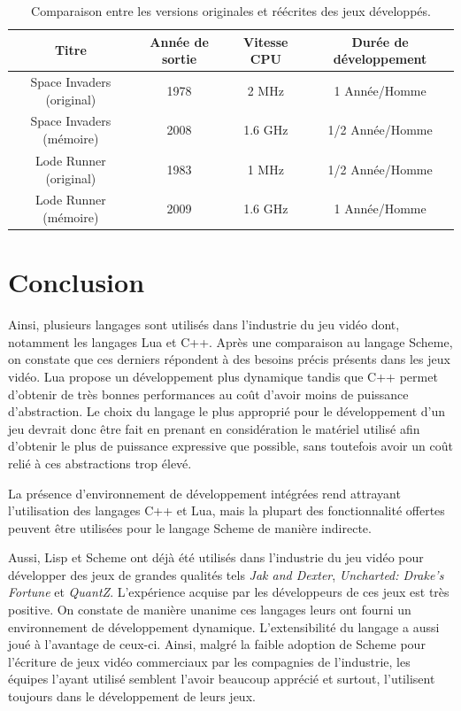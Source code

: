 \documentclass[12pt,twoside,letterpaper,francais]{book}
\newcommand{\customizedTableName}{\textsc{Tableau}}
\begin{document}
\renewcommand{\tablename}{\customizedTableName}
\begin{table}[htb!]
  \begin{tabular}{cccc}
    Titre & Année de sortie & Vitesse CPU & Durée de développement\\
    \hline \hline 
    Space Invaders (original) & 1978 & 2 MHz & 1 Année/Homme\\
    Space Invaders (mémoire) & 2008 & 1.6 GHz & 1/2 Année/Homme\\
    \hline
    Lode Runner (original) & 1983 & 1 MHz & 1/2 Année/Homme\\
    Lode Runner (mémoire) & 2009 & 1.6 GHz & 1 Année/Homme\\
    \hline
  \end{tabular}
  \caption{Comparaison entre les versions originales et réécrites des
    jeux développés.}
  \label{Rev:comp}
\end{table}

\FloatBarrier
\section{Conclusion}
Ainsi, plusieurs langages sont utilisés dans l'industrie du jeu vidéo
dont, notamment les langages Lua et C++. Après une comparaison au
langage Scheme, on constate que ces derniers répondent à des besoins
précis présents dans les jeux vidéo. Lua propose un dévelop\-pement
plus dynamique tandis que C++ permet d'obtenir de très bonnes
performances au coût d'avoir moins de puissance d'abstraction. Le
choix du langage le plus approprié pour le dévelop\-pement d'un jeu
devrait donc être fait en prenant en considération le matériel utilisé
afin d'obtenir le plus de puissance expressive que possible, sans
toutefois avoir un coût relié à ces abstractions trop élevé.

La présence d'environnement de développement intégrées rend attrayant
l'utilisation des langages C++ et Lua, mais la plupart des
fonctionnalité offertes peuvent être utilisées pour le langage Scheme
de manière indirecte.

Aussi, Lisp et Scheme ont déjà été utilisés dans l'industrie du jeu
vidéo pour développer des jeux de grandes qualités tels \textit{Jak
  and Dexter}, \textit{Uncharted: Drake's Fortune} et
\textit{QuantZ}. L'expérience acquise par les développeurs de ces jeux
est très positive. On constate de manière unanime ces langages leurs
ont fourni un environnement de dévelop\-pement
dynamique. L'extensibilité du langage a aussi joué à l'avantage de
ceux-ci. Ainsi, malgré la faible adoption de Scheme pour l'écriture de
jeux vidéo commerciaux par les compagnies de l'industrie, les équipes
l'ayant utilisé semblent l'avoir beaucoup apprécié et surtout,
l'utilisent toujours dans le dévelop\-pement de leurs jeux.
\end{document}

